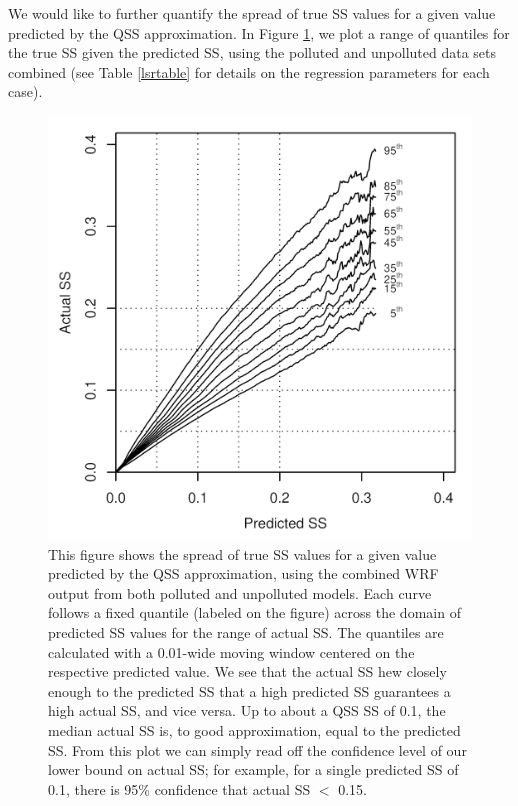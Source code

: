 \documentclass{article}
\begin{document}
We would like to further quantify the spread of true SS values for a given value predicted by the QSS approximation. In Figure \ref{ssquantiles}, we plot a range of quantiles for the true SS given the predicted SS, using the polluted and unpolluted data sets combined (see Table \ref{lsrtable} for details on the regression parameters for each case). 
\begin{figure}[ht]
	\centering
	\includegraphics[width=\textwidth]{wrf/18supersat_predict.png}
	\caption{This figure shows the spread of true SS values for a given value predicted by the QSS approximation, using the combined WRF output from both polluted and unpolluted models. Each curve follows a fixed quantile (labeled on the figure) across the domain of predicted SS values for the range of actual SS. The quantiles are calculated with a 0.01-wide moving window centered on the respective predicted value. We see that the actual SS hew closely enough to the predicted SS that a high predicted SS guarantees a high actual SS, and vice versa. Up to about a QSS SS of 0.1, the median actual SS is, to good approximation, equal to the predicted SS. From this plot we can simply read off the confidence level of our lower bound on actual SS; for example, for a single predicted SS of 0.1, there is 95\% confidence that actual SS $<$ 0.15.}
	\label{ssquantiles}
\end{figure}
\end{document}
